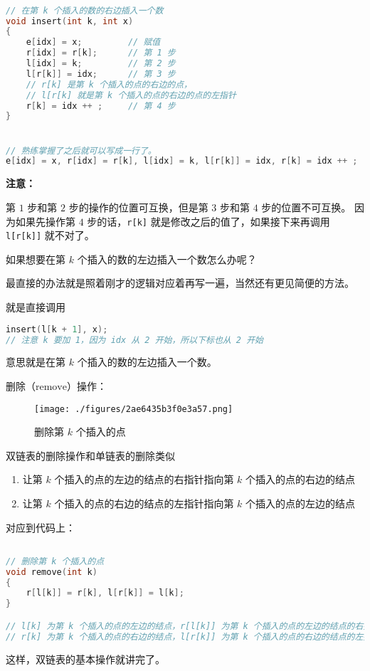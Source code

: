 \begin{lstlisting}[language=cpp]

// 在第 k 个插入的数的右边插入一个数
void insert(int k, int x)
{
    e[idx] = x;         // 赋值
    r[idx] = r[k];      // 第 1 步
    l[idx] = k;         // 第 2 步
    l[r[k]] = idx;      // 第 3 步
    // r[k] 是第 k 个插入的点的右边的点，
    // l[r[k] 就是第 k 个插入的点的右边的点的左指针
    r[k] = idx ++ ;     // 第 4 步
}


// 熟练掌握了之后就可以写成一行了。
e[idx] = x, r[idx] = r[k], l[idx] = k, l[r[k]] = idx, r[k] = idx ++ ;

\end{lstlisting}

\textbf{注意：}

第 $1$ 步和第 $2$ 步的操作的位置可互换，但是第 $3$ 步和第 $4$ 步的位置不可互换。
因为如果先操作第 $4$ 步的话，\verb|r[k]| 就是修改之后的值了，如果接下来再调用 \verb|l[r[k]]| 就不对了。

如果想要在第 $k$ 个插入的数的左边插入一个数怎么办呢？

最直接的办法就是照着刚才的逻辑对应着再写一遍，当然还有更见简便的方法。

就是直接调用 \begin{lstlisting}[language=cpp]
insert(l[k + 1], x);
// 注意 k 要加 1，因为 idx 从 2 开始，所以下标也从 2 开始
\end{lstlisting}
意思就是在第 $k$ 个插入的数的左边插入一个数。

删除（$\text{remove}$）操作：
\begin{figure}[ht]
\centering
\texttt{[image: ./figures/2ae6435b3f0e3a57.png]}
\caption{删除第 $k$ 个插入的点} \label{fig_DList_3}
\end{figure}

双链表的删除操作和单链表的删除类似

\begin{enumerate}
\item 让第 $k$ 个插入的点的左边的结点的右指针指向第 $k$ 个插入的点的右边的结点
\item 让第 $k$ 个插入的点的右边的结点的左指针指向第 $k$ 个插入的点的左边的结点
\end{enumerate}

对应到代码上：

\begin{lstlisting}[language=cpp]

// 删除第 k 个插入的点
void remove(int k)
{
    r[l[k]] = r[k], l[r[k]] = l[k];
}

// l[k] 为第 k 个插入的点的左边的结点，r[l[k]] 为第 k 个插入的点的左边的结点的右指针
// r[k] 为第 k 个插入的点的右边的结点，l[r[k]] 为第 k 个插入的点的右边的结点的左指针
\end{lstlisting}

这样，双链表的基本操作就讲完了。